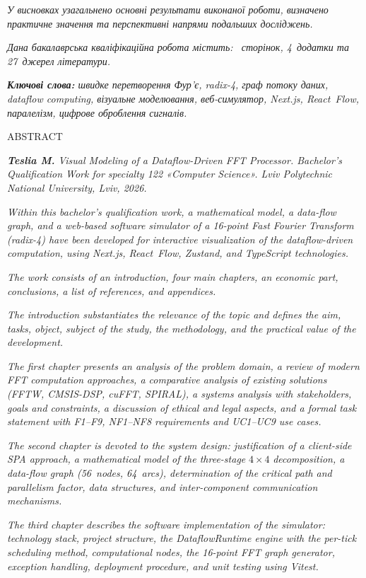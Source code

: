 \documentclass[
]{article}
\begin{document}
\emph{У висновках узагальнено основні результати виконаної роботи,
визначено практичне значення та перспективні напрями подальших
досліджень.}

\emph{Дана бакалаврська кваліфікаційна робота містить: ~сторінок,
4~додатки та 27~джерел літератури.}

\emph{\textbf{Ключові слова:} швидке перетворення Фур'є, radix-4, граф
потоку даних, dataflow computing, візуальне моделювання, веб-симулятор,
Next.js, React~Flow, паралелізм, цифрове оброблення сигналів.}

\protect{}\label{_Toc230379704}{}ABSTRACT

\emph{\textbf{Teslia M.} Visual Modeling of a Dataflow-Driven FFT
Processor. Bachelor's Qualification Work for specialty 122 «Computer
Science». Lviv Polytechnic National University, Lviv, 2026.}

\emph{Within this bachelor's qualification work, a mathematical model, a
data-flow graph, and a web-based software simulator of a 16-point Fast
Fourier Transform (radix-4) have been developed for interactive
visualization of the dataflow-driven computation, using Next.js,
React~Flow, Zustand, and TypeScript technologies.}

\emph{The work consists of an introduction, four main chapters, an
economic part, conclusions, a list of references, and appendices.}

\emph{The introduction substantiates the relevance of the topic and
defines the aim, tasks, object, subject of the study, the methodology,
and the practical value of the development.}

\emph{The first chapter presents an analysis of the problem domain, a
review of modern FFT computation approaches, a comparative analysis of
existing solutions (FFTW, CMSIS-DSP, cuFFT, SPIRAL), a systems analysis
with stakeholders, goals and constraints, a discussion of ethical and
legal aspects, and a formal task statement with F1--F9, NF1--NF8
requirements and UC1--UC9 use cases.}

\emph{The second chapter is devoted to the system design: justification
of a client-side SPA approach, a mathematical model of the three-stage}
\(4 \times 4\) \emph{decomposition, a data-flow graph (56~nodes,
64~arcs), determination of the critical path and parallelism factor,
data structures, and inter-component communication mechanisms.}

\emph{The third chapter describes the software implementation of the
simulator: technology stack, project structure, the DataflowRuntime
engine with the per-tick scheduling method, computational nodes, the 16-point FFT
graph generator, exception handling, deployment procedure, and unit testing
using Vitest.}
\end{document}
